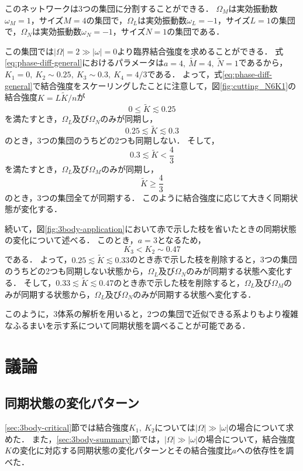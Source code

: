 \documentclass[../main]{subfiles}
\begin{document}
このネットワークは3つの集団に分割することができる．
$\Omega_M$は実効振動数$\omega_M=1$，サイズ$M=4$の集団で，$\Omega_L$は実効振動数$\omega_L=-1$，サイズ$L=1$の集団で，$\Omega_N$は実効振動数$\omega_N=-1$，サイズ$N=1$の集団である．

この集団では$|\Omega|=2\gg|\omega|=0$より臨界結合強度を求めることができる．
式\eqref{eq:phase-diff-general}におけるパラメータは$a=4,\ \tilde{M}=4,\ \tilde{N}=1$であるから，
$K_1=0,\ K_2\sim 0.25,\ K_3\sim 0.3,\ K_4=4/3$である．
よって，式\eqref{eq:phase-diff-general}で結合強度をスケーリングしたことに注意して，図\ref{fig:cutting_N6K1}の結合強度$K=L\tilde{K}/n$が
\begin{equation*}
    0\leq \tilde{K}\lesssim 0.25
\end{equation*}
を満たすとき，$\Omega_L$及び$\Omega_N$のみが同期し，
\begin{equation*}
    0.25\lesssim \tilde{K}\lesssim 0.3
\end{equation*}
のとき，3つの集団のうちどの2つも同期しない．
そして，
\begin{equation*}
    0.3\lesssim \tilde{K}<\frac{4}{3}
\end{equation*}
を満たすとき，$\Omega_L$及び$\Omega_M$のみが同期し，
\begin{equation*}
    \tilde{K}\geq \frac{4}{3}
\end{equation*}
のとき，3つの集団全てが同期する．
このように結合強度に応じて大きく同期状態が変化する．

続いて，図\ref{fig:3body-application}において赤で示した枝を省いたときの同期状態の変化について述べる．
このとき，$a=3$となるため，
\begin{equation*}
    K_3<K_2\sim 0.47
\end{equation*}
である．
よって，$0.25\lesssim \tilde{K}\lesssim 0.33$のとき赤で示した枝を削除すると，3つの集団のうちどの2つも同期しない状態から，$\Omega_L$及び$\Omega_N$のみが同期する状態へ変化する．
そして，$0.33\lesssim \tilde{K}\lesssim 0.47$のとき赤で示した枝を削除すると，$\Omega_L$及び$\Omega_M$のみが同期する状態から，$\Omega_L$及び$\Omega_N$のみが同期する状態へ変化する．

このように，3体系の解析を用いると，2つの集団で近似できる系よりもより複雑なふるまいを示す系について同期状態を調べることが可能である．


\section{議論}
\label{sec:3body-discussion}
\subsection{同期状態の変化パターン}
\ref{sec:3body-critical}節では結合強度$K_1,\ K_2$については$|\Omega|\gg|\omega|$の場合について求めた．
また，\ref{sec:3body-summary}節では，$|\Omega|\gg|\omega|$の場合について，結合強度$K$の変化に対応する同期状態の変化パターンとその結合強度比$a$への依存性を調べた．
\end{document}
